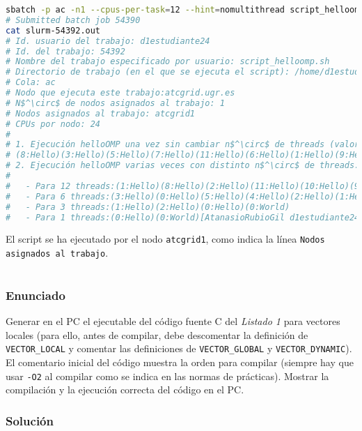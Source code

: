 \begin{lstlisting}[language=sh]
sbatch -p ac -n1 --cpus-per-task=12 --hint=nomultithread script_helloomp.sh
# Submitted batch job 54390
cat slurm-54392.out
# Id. usuario del trabajo: d1estudiante24
# Id. del trabajo: 54392
# Nombre del trabajo especificado por usuario: script_helloomp.sh
# Directorio de trabajo (en el que se ejecuta el script): /home/d1estudiante24/bp0/ejer3
# Cola: ac
# Nodo que ejecuta este trabajo:atcgrid.ugr.es
# N$^\circ$ de nodos asignados al trabajo: 1
# Nodos asignados al trabajo: atcgrid1
# CPUs por nodo: 24
#
# 1. Ejecución helloOMP una vez sin cambiar n$^\circ$ de threads (valor por defecto):
# (8:Hello)(3:Hello)(5:Hello)(7:Hello)(11:Hello)(6:Hello)(1:Hello)(9:Hello)(4:Hello)(0:Hello)(2:Hello)(10:Hello)(0:World)
# 2. Ejecución helloOMP varias veces con distinto n$^\circ$ de threads:
#
#   - Para 12 threads:(1:Hello)(8:Hello)(2:Hello)(11:Hello)(10:Hello)(9:Hello)(0:Hello)(7:Hello)(5:Hello)(4:Hello)(6:Hello)(3:Hello)(0:World)
#   - Para 6 threads:(3:Hello)(0:Hello)(5:Hello)(4:Hello)(2:Hello)(1:Hello)(0:World)
#   - Para 3 threads:(1:Hello)(2:Hello)(0:Hello)(0:World)
#   - Para 1 threads:(0:Hello)(0:World)[AtanasioRubioGil d1estudiante24@atcgrid:~/bp0/ejer3] 2020-06-11 jueves
\end{lstlisting}

El script se ha ejecutado por el nodo \texttt{atcgrid1}, como indica la línea \texttt{Nodos asignados al trabajo}.

\pagebreak

\section{}\label{ej1-5}

\subsubsection{Enunciado}

Generar en el PC el ejecutable del código fuente C del \textit{Listado 1} para vectores locales (para ello, antes de compilar, debe descomentar la definición de \texttt{VECTOR\_LOCAL} y comentar las definiciones de \texttt{VECTOR\_GLOBAL} y \texttt{VECTOR\_DYNAMIC}).
El comentario inicial del código muestra la orden para compilar (siempre hay que usar \texttt{-O2} al compilar como se indica en las normas de prácticas).
Mostrar la compilación y la ejecución correcta del código en el PC\@.

\subsubsection{Solución}

